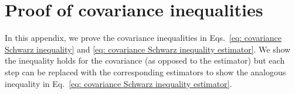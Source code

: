 
\section{Proof of covariance inequalities}
\label{app: covariance cauchy-Schwarz}

In this appendix, we prove the covariance inequalities in Eqs.~\ref{eq: covariance Schwarz inequality} and \ref{eq: covariance Schwarz inequality estimator}. We show the inequality holds for the covariance (as opposed to the estimator) but each step can be replaced with the corresponding estimators to show the analogous inequality in Eq.~\ref{eq: covariance Schwarz inequality estimator}.

